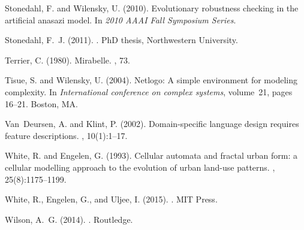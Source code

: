 \documentclass[10pt]{article}
\begin{document}
\begin{thebibliography}{}
Stonedahl, F. and Wilensky, U. (2010).
\newblock Evolutionary robustness checking in the artificial anasazi model.
\newblock In {\em 2010 AAAI Fall Symposium Series}.

Stonedahl, F.~J. (2011).
.
\newblock PhD thesis, Northwestern University.

Terrier, C. (1980).
\newblock Mirabelle.
, 73.

Tisue, S. and Wilensky, U. (2004).
\newblock Netlogo: A simple environment for modeling complexity.
\newblock In {\em International conference on complex systems}, volume~21,
  pages 16--21. Boston, MA.

Van~Deursen, A. and Klint, P. (2002).
\newblock Domain-specific language design requires feature descriptions.
, 10(1):1--17.

White, R. and Engelen, G. (1993).
\newblock Cellular automata and fractal urban form: a cellular modelling
  approach to the evolution of urban land-use patterns.
, 25(8):1175--1199.

White, R., Engelen, G., and Uljee, I. (2015).
.
\newblock MIT Press.

Wilson, A.~G. (2014).
.
\newblock Routledge.

\end{thebibliography}
\end{document}
